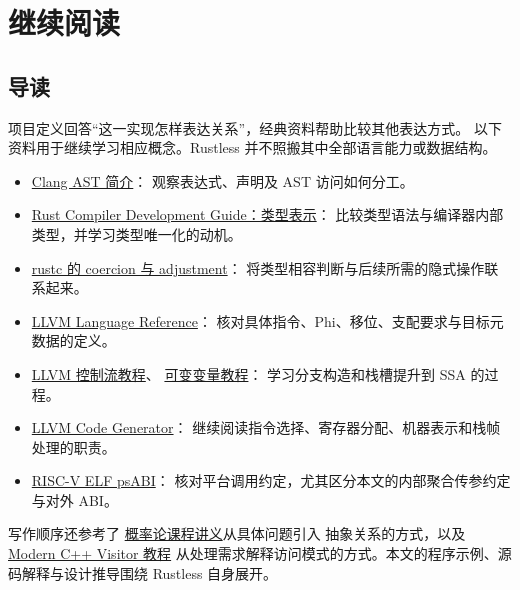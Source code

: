 \chapter{继续阅读}
\section*{导读}
项目定义回答“这一实现怎样表达关系”，经典资料帮助比较其他表达方式。
以下资料用于继续学习相应概念。Rustless 并不照搬其中全部语言能力或数据结构。
\begin{itemize}
\item \href{https://clang.llvm.org/docs/IntroductionToTheClangAST.html}{Clang AST 简介}：
  观察表达式、声明及 AST 访问如何分工。
\item \href{https://rustc-dev-guide.rust-lang.org/ty.html}{Rust Compiler Development Guide：类型表示}：
  比较类型语法与编译器内部类型，并学习类型唯一化的动机。
\item \href{https://rustc-dev-guide.rust-lang.org/hir-typeck/coercions.html}{rustc 的 coercion 与 adjustment}：
  将类型相容判断与后续所需的隐式操作联系起来。
\item \href{https://llvm.org/docs/LangRef.html}{LLVM Language Reference}：
  核对具体指令、Phi、移位、支配要求与目标元数据的定义。
\item \href{https://llvm.org/docs/tutorial/MyFirstLanguageFrontend/LangImpl05.html}{LLVM 控制流教程}、
  \href{https://llvm.org/docs/tutorial/MyFirstLanguageFrontend/LangImpl07.html}{可变变量教程}：
  学习分支构造和栈槽提升到 SSA 的过程。
\item \href{https://llvm.org/docs/CodeGenerator.html}{LLVM Code Generator}：
  继续阅读指令选择、寄存器分配、机器表示和栈帧处理的职责。
\item \href{https://riscv-non-isa.github.io/riscv-elf-psabi-doc/}{RISC-V ELF psABI}：
  核对平台调用约定，尤其区分本文的内部聚合传参约定与对外 ABI。
\end{itemize}
写作顺序还参考了
\href{https://chihaozhang.com/teaching/Prob2026/}{概率论课程讲义}从具体问题引入
抽象关系的方式，以及
\href{https://awesome-embedded-learning-studio.github.io/Tutorial_AwesomeModernCPP/vol4-advanced/vol4-generics-patterns/16-visitor}{Modern C++ Visitor 教程}
从处理需求解释访问模式的方式。本文的程序示例、源码解释与设计推导围绕
Rustless 自身展开。
